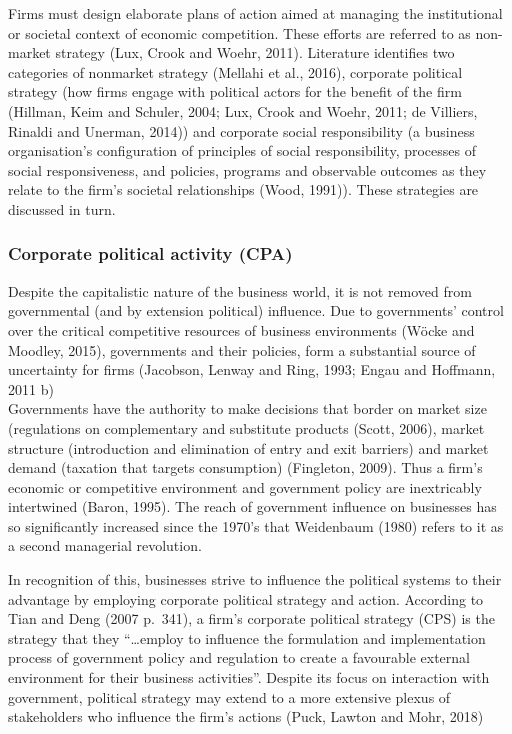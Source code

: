 \documentclass[
]{mitthesis}
\begin{document}
Firms must design elaborate plans of action aimed at managing the institutional or societal context of economic competition. These efforts are referred to as non-market strategy (Lux, Crook and Woehr, 2011). Literature identifies two categories of nonmarket strategy (Mellahi et al., 2016), corporate political strategy (how firms engage with political actors for the benefit of the firm (Hillman, Keim and Schuler, 2004; Lux, Crook and Woehr, 2011; de Villiers, Rinaldi and Unerman, 2014)) and corporate social responsibility (a business organisation's configuration of principles of social responsibility, processes of social responsiveness, and policies, programs and observable outcomes as they relate to the firm's societal relationships (Wood, 1991)). These strategies are discussed in turn.

\hypertarget{corporate-political-activity-cpa}{%
\subsubsection{Corporate political activity (CPA)}\label{corporate-political-activity-cpa}}

Despite the capitalistic nature of the business world, it is not removed from governmental (and by extension political) influence. Due to governments' control over the critical competitive resources of business environments (Wöcke and Moodley, 2015), governments and their policies, form a substantial source of uncertainty for firms (Jacobson, Lenway and Ring, 1993; Engau and Hoffmann, 2011 b)\\
Governments have the authority to make decisions that border on market size (regulations on complementary and substitute products (Scott, 2006), market structure (introduction and elimination of entry and exit barriers) and market demand (taxation that targets consumption) (Fingleton, 2009). Thus a firm's economic or competitive environment and government policy are inextricably intertwined (Baron, 1995). The reach of government influence on businesses has so significantly increased since the 1970's that Weidenbaum (1980) refers to it as a second managerial revolution.

In recognition of this, businesses strive to influence the political systems to their advantage by employing corporate political strategy and action. According to Tian and Deng (2007 p.~341), a firm's corporate political strategy (CPS) is the strategy that they ``\ldots employ to influence the formulation and implementation process of government policy and regulation to create a favourable external environment for their business activities''. Despite its focus on interaction with government, political strategy may extend to a more extensive plexus of stakeholders who influence the firm's actions (Puck, Lawton and Mohr, 2018)
\end{document}

